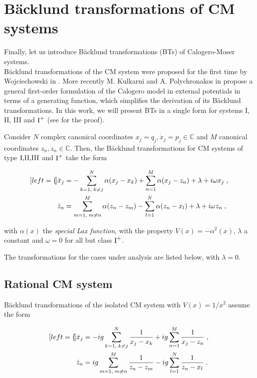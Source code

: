 \section{Bäcklund transformations of CM systems}
Finally, let us introduce Bäcklund transformations (BTs) of Calogero-Moser systems. \\
Bäcklund transformations of the CM system were proposed for the first time by Wojciechowski in \cite{wojciechowski1982}. More recently M. Kulkarni and A. Polychronakos in \cite{kulkarni2017} propose a general first-order formulation of the Calogero model in external potentials in terms of a generating function, which simplifies the derivation of its Bäcklund transformations. In this work, we will present BTs in a single form for systems I, II, III and $\textnormal{I}^+$ (see \cite{philip2019soliton} for the proof).

\begin{thm}
Consider $N$ complex canonical coordinates $x_j = q_j, \dot x_j = p_j \in \mathbb{C}$ and $M$ canonical coordinates $z_n, \dot z_n \in \mathbb{C}$. Then, the Bäcklund transformations for CM systems of type $\textnormal{I,II,III}$ and $\textnormal{I}^+$ take the form

\begin{subequations}
\begin{align}[left=\empheqlbrace]
\dot x_j &= - \sum_{k=1,\;k \neq j}^N \alpha(x_j - x_k) + \sum_{n = 1}^M \alpha(x_j - z_n) + \lambda + i\omega x_j\;,\\
\dot z_n &= \sum_{m=1,\;m \neq n}^M \alpha(z_n - z_m) - \sum_{l = 1}^N \alpha(z_n - x_l) + \lambda + i\omega z_n\;,
\end{align}
\end{subequations}

with $\alpha(x)$ the \textit{special Lax function}, with the property $V(x) = - \alpha^2(x)$, $\lambda$ a constant and $\omega = 0$ for all but class $\textnormal{I}^+$.
\end{thm}

The transformations for the cases under analysis are listed below, with $\lambda = 0$.

\subsection{Rational CM system}
Bäcklund transformations of the isolated CM system with $V(x) = {1}/{x^2}$ assume the form

\begin{subequations}
\begin{align}[left=\empheqlbrace]
\dot x_j &= -ig \sum_{k=1,\;k \neq j}^N \frac{1}{x_j - x_k} + ig\sum_{n = 1}^M \frac{1}{x_j - z_n}\;,\\
\dot z_n &= ig \sum_{m=1,\;m \neq n}^M \frac{1}{z_n - z_m} - ig\sum_{l = 1}^N \frac{1}{z_n - x_l}\;.
\end{align}
\end{subequations}

